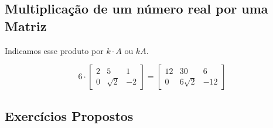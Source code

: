 \subsection{Multiplicação de um número real por uma Matriz}


Indicamos esse produto por $k \cdot A \text{ ou } kA $.
\begin{example}
	\[6 \cdot \begin{bmatrix}
			2 & 5        & 1  \\
			0 & \sqrt{2} & -2
		\end{bmatrix} = \begin{bmatrix}
			12 & 30        & 6   \\
			0  & 6\sqrt{2} & -12
		\end{bmatrix}\]
\end{example}

\subsection{Exercícios Propostos}

